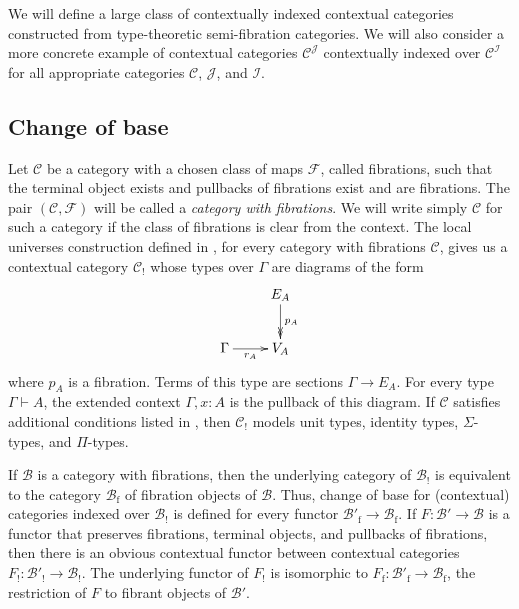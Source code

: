\documentclass[reqno]{amsart}
\theoremstyle{definition}
\theoremstyle{remark}
\newcommand{\fs}[1]{\mathrm{#1}}
\newcommand{\cat}[1]{\mathbf{#1}}
\newcommand{\scat}[1]{\mathcal{#1}}
\newcommand{\Fib}{\mathcal{F}}
\newcommand{\sSet}{\cat{sSet}}
\numberwithin{figure}{section}
\begin{document}
We will define a large class of contextually indexed contextual categories constructed from type-theoretic semi-fibration categories.
We will also consider a more concrete example of contextual categories $\scat{C}^\scat{J}$ contextually indexed over $\scat{C}^\scat{I}$ for all appropriate categories $\scat{C}$, $\scat{J}$, and $\scat{I}$.


\subsection{Change of base}

Let $\scat{C}$ be a category with a chosen class of maps $\Fib$, called fibrations, such that the terminal object exists and pullbacks of fibrations exist and are fibrations.
The pair $(\scat{C},\Fib)$ will be called a \emph{category with fibrations}.
We will write simply $\scat{C}$ for such a category if the class of fibrations is clear from the context.
The local universes construction defined in \cite{local-universes}, for every category with fibrations $\scat{C}$,
gives us a contextual category $\scat{C}_!$ whose types over $\Gamma$ are diagrams of the form
\[ \xymatrix{                       & E_A \ar@{->>}[d]^{p_A} \\
              \Gamma \ar[r]_-{r_A}  & V_A
            } \]
where $p_A$ is a fibration.
Terms of this type are sections $\Gamma \to E_A$.
For every type $\Gamma \vdash A$, the extended context $\Gamma, x : A$ is the pullback of this diagram.
If $\scat{C}$ satisfies additional conditions listed in \cite[Definition~4.2.1]{local-universes}, then $\scat{C}_!$ models unit types, identity types, $\Sigma$-types, and $\Pi$-types.

If $\scat{B}$ is a category with fibrations, then the underlying category of $\scat{B}_!$ is equivalent to the category $\scat{B}_\fs{f}$ of fibration objects of $\scat{B}$.
Thus, change of base for (contextual) categories indexed over $\scat{B}_!$ is defined for every functor $\scat{B}'_\fs{f} \to \scat{B}_\fs{f}$.
If $F : \scat{B}' \to \scat{B}$ is a functor that preserves fibrations, terminal objects, and pullbacks of fibrations, then there is an obvious contextual functor between contextual categories $F_! : \scat{B}'_! \to \scat{B}_!$.
The underlying functor of $F_!$ is isomorphic to $F_\fs{f} : \scat{B}'_\fs{f} \to \scat{B}_\fs{f}$, the restriction of $F$ to fibrant objects of $\scat{B}'$.
\end{document}
